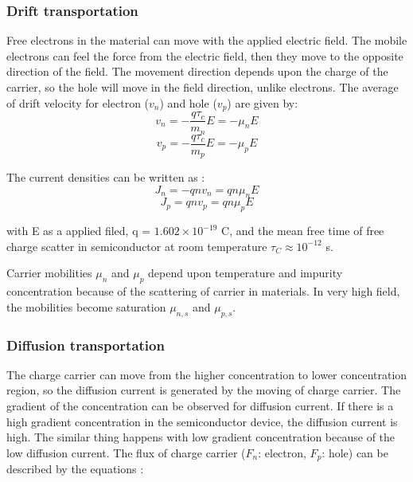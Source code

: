 \documentclass[12pt,a4paper]{article}
\begin{document}
\subsubsection{Drift transportation}

Free electrons in the material can move with the applied electric field. The mobile electrons can feel the force from the electric field, then they move to the opposite direction of the field. The movement direction depends upon the charge of the carrier, so the hole will move in the field direction, unlike electrons. The average of drift velocity for electron ($v_n$) and hole ($v_p$) are given by:
\begin{equation}
    \label{eq:vn}
    v_n = -\frac{q\tau_c}{m_n}E = -\mu_n E
\end{equation}\begin{equation}
    \label{eq:vp}
    v_p = -\frac{q\tau_c}{m_p}E = -\mu_p E
\end{equation}

The current densities can be written as :
\begin{equation}
    \label{eq:vn}
    J_n = -qnv_n = qn\mu_n E
\end{equation}
\begin{equation}
    \label{eq:vn}
    J_p = qnv_p = qn\mu_p E
\end{equation}

with E as a applied filed, q = $1.602\times 10^{-19}$ C, and the mean free time of free charge scatter in semiconductor at room temperature  $\tau_C \approx 10^{-12}$ s.

Carrier mobilities $\mu_n$ and $\mu_p$ depend upon temperature and impurity concentration because of the scattering of carrier in materials. In very high field, the mobilities become saturation $\mu_{n,s}$ and $\mu_{p,s}$.  

\subsubsection{Diffusion transportation}

The charge carrier can move from the higher concentration to lower concentration region, so the diffusion current is generated by the moving of charge carrier. The gradient of the concentration can be observed for diffusion current. If there is a high gradient concentration in the semiconductor device, the diffusion current is high. The similar thing happens with low gradient concentration because of the low diffusion current. The flux of charge carrier ($F_n$: electron, $F_p$: hole) can be described by the equations :
\end{document}
